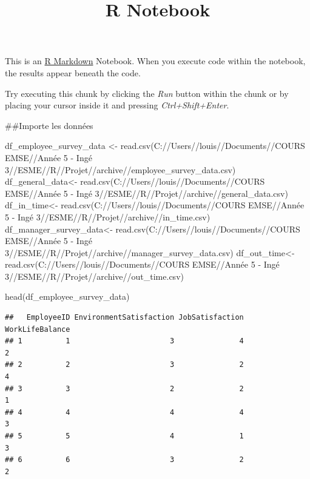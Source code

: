 \documentclass[
]{article}
\title{R Notebook}
\author{}
\date{\vspace{-2.5em}}
\newenvironment{Shaded}{\begin{snugshade}}{\end{snugshade}}
\newcommand{\FunctionTok}[1]{\textcolor[rgb]{0.00,0.00,0.00}{#1}}
\newcommand{\NormalTok}[1]{#1}
\newcommand{\OtherTok}[1]{\textcolor[rgb]{0.56,0.35,0.01}{#1}}
\newcommand{\StringTok}[1]{\textcolor[rgb]{0.31,0.60,0.02}{#1}}
\begin{document}
\maketitle

This is an \href{http://rmarkdown.rstudio.com}{R Markdown} Notebook.
When you execute code within the notebook, the results appear beneath
the code.

Try executing this chunk by clicking the \emph{Run} button within the
chunk or by placing your cursor inside it and pressing
\emph{Ctrl+Shift+Enter}.

\#\#Importe les données

\begin{Shaded}
\begin{Highlighting}[]
\NormalTok{df\_employee\_survey\_data }\OtherTok{\textless{}{-}} \FunctionTok{read.csv}\NormalTok{(}\StringTok{\textquotesingle{}C://Users//louis//Documents//COURS EMSE//Année 5 {-} Ingé 3//ESME//R//Projet//archive//employee\_survey\_data.csv\textquotesingle{}}\NormalTok{)}
\NormalTok{df\_general\_data}\OtherTok{\textless{}{-}} \FunctionTok{read.csv}\NormalTok{(}\StringTok{\textquotesingle{}C://Users//louis//Documents//COURS EMSE//Année 5 {-} Ingé 3//ESME//R//Projet//archive//general\_data.csv\textquotesingle{}}\NormalTok{)}
\NormalTok{df\_in\_time}\OtherTok{\textless{}{-}} \FunctionTok{read.csv}\NormalTok{(}\StringTok{\textquotesingle{}C://Users//louis//Documents//COURS EMSE//Année 5 {-} Ingé 3//ESME//R//Projet//archive//in\_time.csv\textquotesingle{}}\NormalTok{)}
\NormalTok{df\_manager\_survey\_data}\OtherTok{\textless{}{-}} \FunctionTok{read.csv}\NormalTok{(}\StringTok{\textquotesingle{}C://Users//louis//Documents//COURS EMSE//Année 5 {-} Ingé 3//ESME//R//Projet//archive//manager\_survey\_data.csv\textquotesingle{}}\NormalTok{)}
\NormalTok{df\_out\_time}\OtherTok{\textless{}{-}} \FunctionTok{read.csv}\NormalTok{(}\StringTok{\textquotesingle{}C://Users//louis//Documents//COURS EMSE//Année 5 {-} Ingé 3//ESME//R//Projet//archive//out\_time.csv\textquotesingle{}}\NormalTok{)}
\end{Highlighting}
\end{Shaded}

\begin{Shaded}
\begin{Highlighting}[]
\FunctionTok{head}\NormalTok{(df\_employee\_survey\_data)}
\end{Highlighting}
\end{Shaded}

\begin{verbatim}
##   EmployeeID EnvironmentSatisfaction JobSatisfaction WorkLifeBalance
## 1          1                       3               4               2
## 2          2                       3               2               4
## 3          3                       2               2               1
## 4          4                       4               4               3
## 5          5                       4               1               3
## 6          6                       3               2               2
\end{verbatim}
\end{document}
